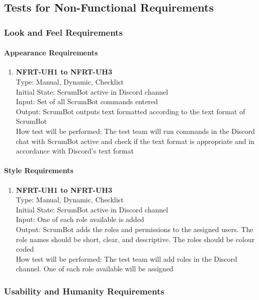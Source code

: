 \documentclass[12pt, titlepage]{article}
\begin{document}
\subsection{Tests for Non-Functional Requirements}

\subsubsection{Look and Feel Requirements}
\paragraph{Appearance Requirements}
\begin{enumerate}
\item{\textbf{NFRT-UH1 to NFRT-UH3}}\\
Type: Manual, Dynamic, Checklist\\
Initial State: ScrumBot active in Discord channel\\
Input: Set of all ScrumBot commands entered\\
Output: ScrumBot outputs text formatted according to the text format of ScrumBot\\
How test will be performed: The test team will run commands in the Discord chat with ScrumBot active and check if the text format is appropriate and in accordance with Discord's text format
\end{enumerate}

\paragraph{Style Requirements}
\begin{enumerate}
\item{\textbf{NFRT-UH1 to NFRT-UH3}}\\
Type: Manual, Dynamic, Checklist\\
Initial State: ScrumBot active in Discord channel\\
Input: One of each role available is added\\
Output: ScrumBot adds the roles and permissions to the assigned users. The role names should be short, clear, and descriptive. The roles should be colour coded\\
How test will be performed: The test team will add roles in the Discord channel. One of each role available will be assigned
\end{enumerate}

\subsubsection{Usability and Humanity Requirements}
\end{document}
